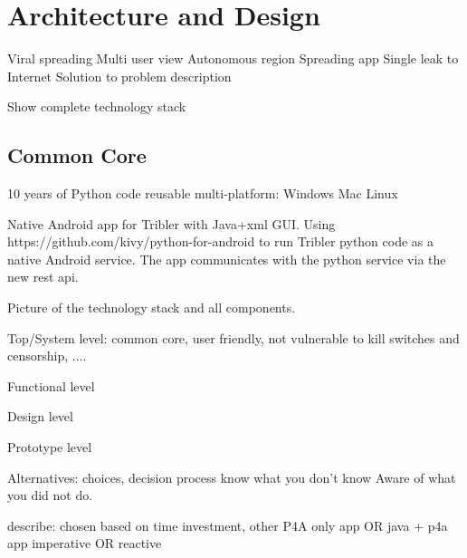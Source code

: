 \chapter{Architecture and Design}

Viral spreading
Multi user view
Autonomous region
Spreading app
Single leak to Internet
Solution to problem description


Show complete technology stack


\section{Common Core}
10 years of Python code 
reusable multi-platform: Windows Mac Linux


Native Android app for Tribler with Java+xml GUI.
Using https://github.com/kivy/python-for-android to run Tribler python code as a native Android service.
The app communicates with the python service via the new rest api.

Picture of the technology stack and all components.



Top/System level: common core, user friendly, not vulnerable to kill switches and censorship, ....


Functional level

Design level

Prototype level




Alternatives: choices, decision process
know what you don't know
Aware of what you did not do.


describe: chosen based on time investment, other 
P4A only app OR java + p4a app
imperative OR reactive
